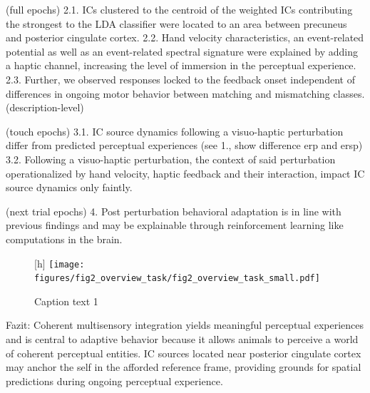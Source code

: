 (full epochs)
2.1. ICs clustered to the centroid of the weighted ICs contributing the strongest to the LDA classifier were located to an area between precuneus and posterior cingulate cortex.
2.2. Hand velocity characteristics, an event-related potential as well as an event-related spectral signature were explained by adding a haptic channel, increasing the level of immersion in the perceptual experience.
2.3. Further, we observed responses locked to the feedback onset independent of differences in ongoing motor behavior between matching and mismatching classes. (description-level)

(touch epochs)
3.1. IC source dynamics following a visuo-haptic perturbation differ from predicted perceptual experiences (see 1., show difference erp and ersp)
3.2. Following a visuo-haptic perturbation, the context of said perturbation operationalized by hand velocity, haptic feedback and their interaction, impact IC source dynamics only faintly.

(next trial epochs)
4. Post perturbation behavioral adaptation is in line with previous findings and may be explainable through reinforcement learning like computations in the brain.

\begin{figure}{\textwidth}[h]
    \centering\texttt{[image: figures/fig2\_overview\_task/fig2\_overview\_task\_small.pdf]}
    \label{task}
    \caption{Caption text 1}
\end{figure}

Fazit:
Coherent multisensory integration yields meaningful perceptual experiences and is central to adaptive behavior because it allows animals to perceive a world of coherent perceptual entities. IC sources located near posterior cingulate cortex may anchor the self in the afforded reference frame, providing grounds for spatial predictions during ongoing perceptual experience.


